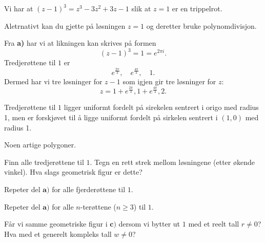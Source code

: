 \begin{losning}

\begin{punkt}
Vi har at $(z-1)^3=z^3-3z^2+3z-1$ slik at $z=1$ er en trippelrot.

\noindent
Aletrnativt kan du gjette på løsningen $z=1$ og deretter bruke polynomdivisjon.
\end{punkt}

\begin{punkt}


Fra \textbf{a)} har vi at likningen kan skrives på formen $$(z-1)^3=1=e^{2\pi i}.$$ Tredjerøttene til $1$ er $$e^{\frac{2\pi}{3}}, \quad e^{\frac{4\pi}{3}},\quad 1.$$ Dermed har vi tre løsninger for $z-1$ som igjen gir tre løsninger for $z$: $$z=1+e^{\frac{2\pi}{3}},1+e^{\frac{4\pi}{3}},2.$$

\noindent
Tredjerøttene til $1$ ligger uniformt fordelt på sirekelen sentrert i origo med radius 1, men er forskjøvet til å ligge uniformt fordelt på sirkelen sentrert i $(1,0)$ med radius 1.


\end{punkt}

\end{losning}

\begin{oppgave}
Noen artige polygoner.
\begin{punkt}
Finn alle tredjerøttene til $1$. Tegn en rett strek mellom løsningene (etter økende vinkel). Hva slags geometrisk figur er dette?
\end{punkt}

\begin{punkt}
Repeter del $\textbf{a)}$ for alle fjerderøttene til $1$.
\end{punkt}


\begin{punkt}
Repeter del $\textbf{a)}$ for alle $n$-terøttene ($n\geq 3$) til $1$.
\end{punkt}

\begin{punkt}
Får vi samme geometriske figur i $\textbf{c)}$ dersom vi bytter ut $1$ med et reelt tall $r \neq 0$? Hva med et generelt kompleks tall $w\neq 0$?
\end{punkt}
\end{oppgave}


